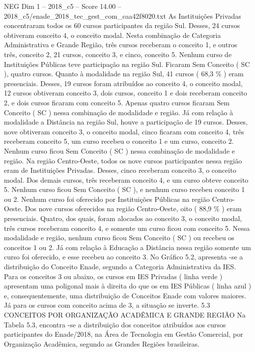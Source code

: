 \begin{textsample}{NEG Dim 1 – 2018\_c5 – Score 14.00 – 2018\_c5/enade\_2018\_tec\_gest\_com\_caa42f8020.txt}
As Instituições Privadas concentraram todos os 60 cursos participantes da região Sul.
Desses, 24 cursos obtiveram conceito 4, o conceito modal.
Nesta combinação de Categoria Administrativa e Grande Região, três cursos receberam o conceito 1, e outros três, conceito 2, 21 cursos, conceito 3, e cinco, conceito 5.
Nenhum curso de Instituições Públicas teve participação na região Sul.
Ficaram Sem Conceito ( SC ), quatro cursos.
Quanto à modalidade na região Sul, 41 cursos ( 68,3 \% ) eram presenciais.
Desses, 19 cursos foram atribuídos ao conceito 4, o conceito modal, 12 cursos obtiveram conceito 3, dois cursos, conceito 1 e dois receberam conceito 2, e dois cursos ficaram com conceito 5.
Apenas quatro cursos ficaram Sem Conceito ( SC ) nessa combinação de modalidade e região.
Já com relação à modalidade a Distância na região Sul, houve a participação de 19 cursos.
Desses, nove obtiveram conceito 3, o conceito modal, cinco ficaram com conceito 4, três receberam conceito 5, um curso recebeu o conceito 1 e um curso, conceito 2.
Nenhum curso ficou Sem Conceito ( SC ) nessa combinação de modalidade e região.
Na região Centro-Oeste, todos os nove cursos participantes nessa região eram de Instituições Privadas.
Desses, cinco receberam conceito 3, o conceito modal.
Dos demais cursos, três receberam conceito 4, e um curso obteve conceito 5.
Nenhum curso ficou Sem Conceito ( SC ), e nenhum curso recebeu conceito 1 ou 2.
Nenhum curso foi oferecido por Instituições Públicas na região Centro-Oeste.
Dos nove cursos oferecidos na região Centro-Oeste, oito ( 88,9 \% ) eram presenciais.
Quatro, dos quais, foram alocados ao conceito 3, o conceito modal, três cursos receberam conceito 4, e somente um curso ficou com conceito 5.
Nessa modalidade e região, nenhum curso ficou Sem Conceito ( SC ) ou recebeu os conceitos 1 ou 2.
Já com relação à Educação a Distância nessa região somente um curso foi oferecido, e esse recebeu ao conceito 3.
No Gráfico 5.2, apresenta -se a distribuição do Conceito Enade, segundo a Categoria Administrativa da IES.
Para os conceitos 3 ou abaixo, os cursos em IES Privadas ( linha verde ) apresentam uma poligonal mais à direita do que os em IES Públicas ( linha azul ) e, consequentemente, uma distribuição de Conceitos Enade com valores maiores.
Já para os cursos com conceito acima de 3, a situação se inverte. 5.3 CONCEITOS POR ORGANIZAÇÃO ACADÊMICA E GRANDE REGIÃO Na Tabela 5.3, encontra -se a distribuição dos conceitos atribuídos aos cursos participantes do Enade/2018, na Área de Tecnologia em Gestão Comercial, por Organização Acadêmica, segundo as Grandes Regiões brasileiras.

\end{textsample}
